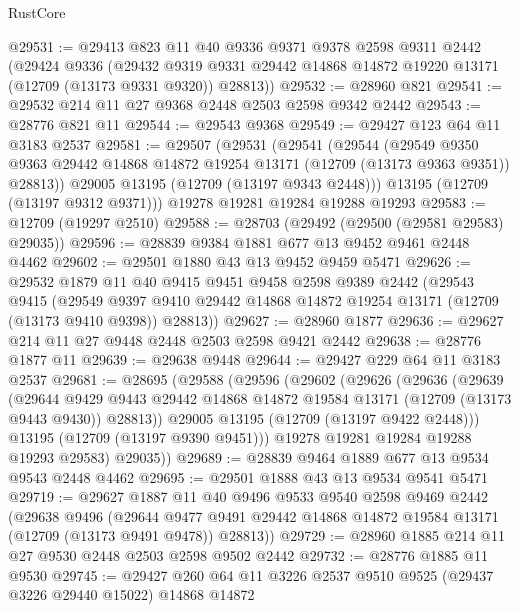 \begin{lexlean}{RustCore}
\begin{coremodule}
@29531 := @29413
    @823
    @11
    @40
    @9336
    @9371
    @9378
    @2598
    @9311
    @2442
    (@29424
      @9336
      (@29432 @9319 @9331 @29442 @14868 @14872 @19220 @13171 (@12709 (@13173 @9331 @9320)) @28813))
@29532 := @28960 @821
@29541 := @29532 @214 @11 @27 @9368 @2448 @2503 @2598 @9342 @2442
@29543 := @28776 @821 @11
@29544 := @29543 @9368
@29549 := @29427 @123 @64 @11 @3183 @2537
@29581 := @29507
    (@29531
      (@29541
        (@29544
          (@29549
            @9350
            @9363
            @29442
            @14868
            @14872
            @19254
            @13171
            (@12709 (@13173 @9363 @9351))
            @28813))
        @29005
        @13195
        (@12709 (@13197 @9343 @2448)))
      @13195
      (@12709 (@13197 @9312 @9371)))
    @19278
    @19281
    @19284
    @19288
    @19293
@29583 := @12709 (@19297 @2510)
@29588 := @28703 (@29492 (@29500 (@29581 @29583) @29035))
@29596 := @28839 @9384 @1881 @677 @13 @9452 @9461 @2448 @4462
@29602 := @29501 @1880 @43 @13 @9452 @9459 @5471
@29626 := @29532
    @1879
    @11
    @40
    @9415
    @9451
    @9458
    @2598
    @9389
    @2442
    (@29543
      @9415
      (@29549 @9397 @9410 @29442 @14868 @14872 @19254 @13171 (@12709 (@13173 @9410 @9398)) @28813))
@29627 := @28960 @1877
@29636 := @29627 @214 @11 @27 @9448 @2448 @2503 @2598 @9421 @2442
@29638 := @28776 @1877 @11
@29639 := @29638 @9448
@29644 := @29427 @229 @64 @11 @3183 @2537
@29681 := @28695
    (@29588
      (@29596
        (@29602
          (@29626
            (@29636
              (@29639
                (@29644
                  @9429
                  @9443
                  @29442
                  @14868
                  @14872
                  @19584
                  @13171
                  (@12709 (@13173 @9443 @9430))
                  @28813))
              @29005
              @13195
              (@12709 (@13197 @9422 @2448)))
            @13195
            (@12709 (@13197 @9390 @9451)))
          @19278
          @19281
          @19284
          @19288
          @19293
          @29583)
        @29035))
@29689 := @28839 @9464 @1889 @677 @13 @9534 @9543 @2448 @4462
@29695 := @29501 @1888 @43 @13 @9534 @9541 @5471
@29719 := @29627
    @1887
    @11
    @40
    @9496
    @9533
    @9540
    @2598
    @9469
    @2442
    (@29638
      @9496
      (@29644 @9477 @9491 @29442 @14868 @14872 @19584 @13171 (@12709 (@13173 @9491 @9478)) @28813))
@29729 := @28960 @1885 @214 @11 @27 @9530 @2448 @2503 @2598 @9502 @2442
@29732 := @28776 @1885 @11 @9530
@29745 := @29427 @260 @64 @11 @3226 @2537 @9510 @9525 (@29437 @3226 @29440 @15022) @14868 @14872

\end{coremodule}
\end{lexlean}
